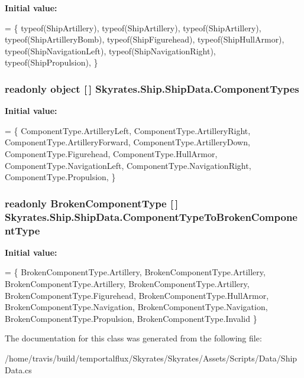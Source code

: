{\bfseries Initial value\-:}
\begin{DoxyCode}
=
        \{
            typeof(ShipArtillery), typeof(ShipArtillery),
            typeof(ShipArtillery), typeof(ShipArtilleryBomb),
            typeof(ShipFigurehead),
            typeof(ShipHullArmor),
            typeof(ShipNavigationLeft), typeof(ShipNavigationRight),
            typeof(ShipPropulsion),
        \}
\end{DoxyCode}
\hypertarget{class_skyrates_1_1_ship_1_1_ship_data_a7676fe15a5c44c7b7f46d21ca9118b5d}{
\subsubsection[{Component\-Types}]{\setlength{\rightskip}{0pt plus 5cm}readonly object \mbox{[}$\,$\mbox{]} Skyrates.\-Ship.\-Ship\-Data.\-Component\-Types\hspace{0.3cm}{\ttfamily [static]}}}\label{class_skyrates_1_1_ship_1_1_ship_data_a7676fe15a5c44c7b7f46d21ca9118b5d}
{\bfseries Initial value\-:}
\begin{DoxyCode}
=
        \{
            ComponentType.ArtilleryLeft, ComponentType.ArtilleryRight,
            ComponentType.ArtilleryForward, ComponentType.ArtilleryDown,
            ComponentType.Figurehead,
            ComponentType.HullArmor,
            ComponentType.NavigationLeft, ComponentType.NavigationRight,
            ComponentType.Propulsion,
        \}
\end{DoxyCode}
\hypertarget{class_skyrates_1_1_ship_1_1_ship_data_ad2a032838d09d258c61a67771302d7de}{
\subsubsection[{Component\-Type\-To\-Broken\-Component\-Type}]{\setlength{\rightskip}{0pt plus 5cm}readonly Broken\-Component\-Type \mbox{[}$\,$\mbox{]} Skyrates.\-Ship.\-Ship\-Data.\-Component\-Type\-To\-Broken\-Component\-Type\hspace{0.3cm}{\ttfamily [static]}}}\label{class_skyrates_1_1_ship_1_1_ship_data_ad2a032838d09d258c61a67771302d7de}
{\bfseries Initial value\-:}
\begin{DoxyCode}
=
        \{
            BrokenComponentType.Artillery, BrokenComponentType.Artillery,
            BrokenComponentType.Artillery, BrokenComponentType.Artillery,
            BrokenComponentType.Figurehead,
            BrokenComponentType.HullArmor,
            BrokenComponentType.Navigation, BrokenComponentType.Navigation,
            BrokenComponentType.Propulsion,
            BrokenComponentType.Invalid
        \}
\end{DoxyCode}


The documentation for this class was generated from the following file\-:\begin{DoxyCompactItemize}
\item 
/home/travis/build/temportalflux/\-Skyrates/\-Skyrates/\-Assets/\-Scripts/\-Data/Ship\-Data.\-cs\end{DoxyCompactItemize}
